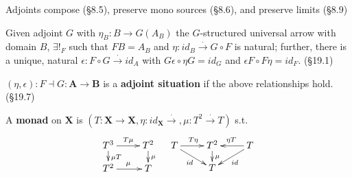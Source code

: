\documentclass[10pt,twocolumn,letterpaper]{article}
\newcommand{\natto}{\overset{\cdot}{\to}}
\newcommand{\defn}[1]{{\bf #1}}
\begin{document}
  Adjoints compose (\S8.5), preserve mono sources (\S8.6), and preserve
  limits (\S8.9)

  Given adjoint $G$ with $\eta_B : B \to G(A_B)$ the $G$-structured
  universal arrow with domain $B$, $\exists!_F$ such that $FB = A_B$ and
  $\eta : id_B \natto G \circ F$ is natural; further, there is a unique,
  natural $\epsilon : F \circ G \natto id_A$ with $G\epsilon \circ \eta G =
  id_G$ and $\epsilon F \circ F \eta = id_F$.  (\S19.1)

  $(\eta,\epsilon) : F \dashv G : \mathbf{A} \to \mathbf{B}$ is a
  \defn{adjoint situation} if the above relationships hold. (\S19.7)

  A \defn{monad} on $\mathbf{X}$ is $(T : \mathbf{X} \to \mathbf{X},
  \eta : id_{\mathbf{X}} \natto, \mu : T^2 \natto T)$ s.t.
  \[\xymatrix@R=10pt{
    T^3 \ar[r]^{T\mu} \ar[d]^{\mu T} & T^2 \ar[d]^\mu \\
    T^2 \ar[r]^{\mu}                 & T
  } \quad \xymatrix@R=10pt{
    T \ar[r]^{T\eta} \ar[dr]_{id} & T^2 \ar[d]^\mu & T \ar[l]_{\eta T} \ar[dl]^{id} \\
        & T & 
  }\]
\end{document}

